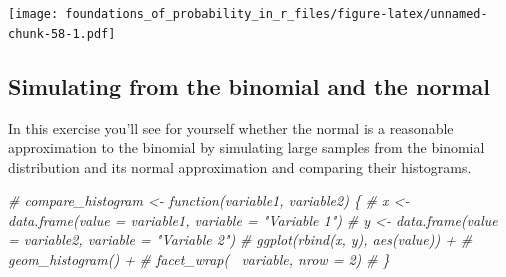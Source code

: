 \documentclass[]{article}
\newenvironment{Shaded}{\begin{snugshade}}{\end{snugshade}}
\newcommand{\CommentTok}[1]{\textcolor[rgb]{0.56,0.35,0.01}{\textit{#1}}}
\newcommand{\ControlFlowTok}[1]{\textcolor[rgb]{0.13,0.29,0.53}{\textbf{#1}}}
\newcommand{\DataTypeTok}[1]{\textcolor[rgb]{0.13,0.29,0.53}{#1}}
\newcommand{\DecValTok}[1]{\textcolor[rgb]{0.00,0.00,0.81}{#1}}
\newcommand{\KeywordTok}[1]{\textcolor[rgb]{0.13,0.29,0.53}{\textbf{#1}}}
\newcommand{\NormalTok}[1]{#1}
\newcommand{\OperatorTok}[1]{\textcolor[rgb]{0.81,0.36,0.00}{\textbf{#1}}}
\newcommand{\StringTok}[1]{\textcolor[rgb]{0.31,0.60,0.02}{#1}}
\begin{document}
\texttt{[image: foundations\_of\_probability\_in\_r\_files/figure-latex/unnamed-chunk-58-1.pdf]}

\hypertarget{simulating-from-the-binomial-and-the-normal}{%
\subsection{Simulating from the binomial and the
normal}\label{simulating-from-the-binomial-and-the-normal}}

In this exercise you'll see for yourself whether the normal is a
reasonable approximation to the binomial by simulating large samples
from the binomial distribution and its normal approximation and
comparing their histograms.

\begin{Shaded}
\begin{Highlighting}[]
\CommentTok{# compare_histogram <- function(variable1, variable2) \{}
\CommentTok{#   x <- data.frame(value = variable1, variable = "Variable 1")}
\CommentTok{#   y <- data.frame(value = variable2, variable = "Variable 2")}
\CommentTok{#   ggplot(rbind(x, y), aes(value)) +}
\CommentTok{#     geom_histogram() +}
\CommentTok{#     facet_wrap(~ variable, nrow = 2)}
\CommentTok{# \}}
\end{Highlighting}
\end{Shaded}

\begin{Shaded}
\end{Shaded}
\end{document}
